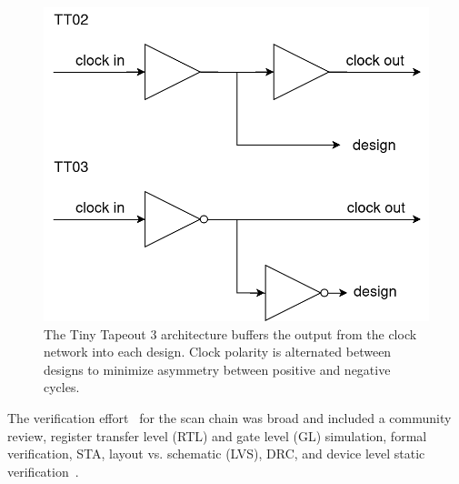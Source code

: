 \begin{figure}[!t]
\centering
\includegraphics[width=\columnwidth]{./Figs/tt02 vs tt03 scanchain clock.png}
\caption{The Tiny Tapeout 3 architecture buffers the output from the clock network into each design. Clock polarity is alternated between designs to minimize asymmetry between positive and negative cycles.}
\label{fig:TT02_vs_TT03}
\end{figure}

The verification effort~\cite{verificationmd} for the scan chain was broad and included a community review, register transfer level (RTL) and gate level (GL) simulation, formal verification\cite{sby}, STA, layout vs. schematic (LVS), DRC, and device level static verification~\cite{cvc}.
